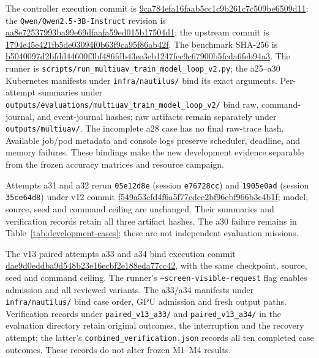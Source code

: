 \documentclass{article}
\begin{document}
The controller execution commit is
\url{9ca784efa16faab5cc1c9b261c7c509be6509d11}; the
\texttt{Qwen/Qwen2.5-3B-Instruct} revision is
\url{aa8e72537993ba99e69dfaafa59ed015b17504d1}; the upstream commit is
\url{1794e45e421fb5de03094f0b63f9ca95f86ab42f}. The benchmark SHA-256 is
\url{b5040097d2bfdd44600f3bf486fdb43ee3eb1247fec9c67900b5fcda6feb94a3}.
The runner is \texttt{scripts/run\_multiuav\_train\_model\_loop\_v2.py};
the a25--a30 Kubernetes manifests under \texttt{infra/nautilus/} bind its exact
arguments. Per-attempt summaries under
\texttt{outputs/evaluations/multiuav\_train\_model\_loop\_v2/} bind raw,
command-journal, and event-journal hashes; raw artifacts remain separately under
\texttt{outputs/multiuav/}. The incomplete a28 case has no final raw-trace hash.
Available job/pod metadata and console logs preserve scheduler, deadline, and
memory failures. These bindings make the new development evidence separable
from the frozen accuracy matrices and resource campaign.

Attempts a31 and a32 rerun \texttt{05e12d8e} (session \texttt{e76728cc})
and \texttt{1905e0ad} (session \texttt{35ce64d8}) under v12
commit \url{f549a53cfd4f6a5f77cdee2bf96ebf966b3c4b1f}; model, source, seed
and command ceiling are unchanged. Their summaries and verification records retain
all three artifact hashes. The a30 failure remains in
Table~\ref{tab:development-cases}; these are not independent evaluation missions.

The v13 paired attempts a33 and a34 bind execution commit
\url{dae9d0eddba9d548b23e16ecbf2e188eda77cc42}, with the same checkpoint,
source, seed and command ceiling. The runner's
\texttt{--screen-visible-request} flag enables admission and all reviewed
variants. The a33/a34 manifests under \texttt{infra/nautilus/} bind case order,
GPU admission and fresh output paths. Verification records under
\texttt{paired\_v13\_a33/} and \texttt{paired\_v13\_a34/} in the evaluation
directory retain original outcomes, the interruption and the recovery attempt;
the latter's \texttt{combined\_verification.json} records all ten completed
case outcomes. These records do not alter frozen M1--M4 results.
\end{document}
